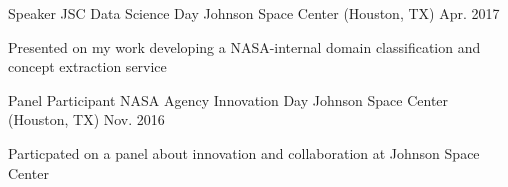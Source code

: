 


\begin{cventries}
  \cventry
    {Speaker} %
    {JSC Data Science Day} %
    {Johnson Space Center (Houston, TX)} %
    {Apr. 2017} %
    {
      \begin{cvitems} %
        \item {Presented on my work developing a NASA-internal domain classification and concept extraction service}
      \end{cvitems}
    }

  \cventry
    {Panel Participant} %
    {NASA Agency Innovation Day} %
    {Johnson Space Center (Houston, TX)} %
    {Nov. 2016} %
    {
      \begin{cvitems} %
        \item {Particpated on a panel about innovation and collaboration at Johnson Space Center}
      \end{cvitems}
    }
    
\end{cventries}
